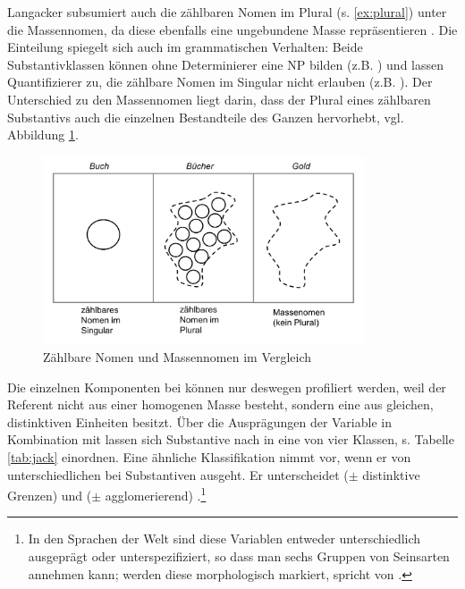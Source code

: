 \begin{exe}
	\ex \label{ex:zaehlbarkeit}
	\begin{xlist}
		\ex \label{ex:count} 
 		\ex \label{ex:mass} 
 	 	\ex \label{ex:plural}  
 			\end{xlist}
\end{exe}

\noindent
Langacker subsumiert auch die zählbaren Nomen im Plural (s. \ref{ex:plural}) unter die Massennomen, da diese ebenfalls eine ungebundene Masse repräsentieren \parencite[77]{Langacker1991}. Die Einteilung spiegelt sich auch im grammatischen Verhalten: Beide Substantivklassen können ohne Determinierer eine NP bilden (z.B. ) und lassen Quantifizierer zu, die zählbare Nomen im Singular nicht erlauben (z.B. ). Der Unterschied zu den Massennomen liegt darin, dass der Plural eines zählbaren Substantivs auch die einzelnen Bestandteile des Ganzen hervorhebt, vgl. Abbildung \ref{abb:langacker-nomen}.

\begin{figure}[h]
\begin{center}
\includegraphics[width=9.5cm]{images/langacker-nomen.jpg}
\caption {Zählbare Nomen und Massennomen im Vergleich \parencite[s.][78]{Langacker1991}}
\label{abb:langacker-nomen}
\end{center}
\end{figure}


Die einzelnen Komponenten bei  können nur deswegen profiliert werden, weil der Referent nicht aus einer homogenen Masse besteht, sondern eine  \parencite[18]{Jackendoff1991} aus gleichen, distinktiven Einheiten besitzt. Über die Ausprägungen der Variable  in Kombination mit  lassen sich Substantive nach \textcite[20]{Jackendoff1991} in eine von vier Klassen, s. Tabelle \ref{tab:jack} einordnen. Eine ähnliche Klassifikation nimmt \textcite{Rijkhoff1991,Rijkhoff2002} vor, wenn er von unterschiedlichen  bei Substantiven ausgeht. 
Er unterscheidet  ($\pm$ distinktive Grenzen) und  ($\pm$ agglomerierend) \parencite[s. auch][102-104]{Zifonun2012}.\footnote{In den Sprachen der Welt sind diese Variablen entweder unterschiedlich ausgeprägt oder unterspezifiziert, so dass man sechs Gruppen von Seinsarten annehmen kann; werden diese morphologisch markiert, spricht \textcite[121]{Rijkhoff2002} von .}

